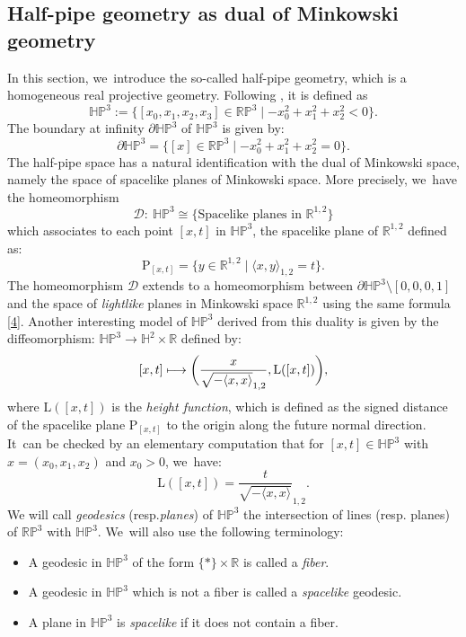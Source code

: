 \documentclass[11pt]{article}
\newcommand{\resp}{resp.\xspace}
\newcommand{\Subsection}{\subsection}
\newcommand\mto{\mathchoice{\longmapsto}{\mapsto}{\mapsto}{\mapsto}}
\theoremstyle{plain}
\theoremstyle{definition}
\newcommand{\minko}{\mathbb{R}^{1,2}}
\newcommand{\HP}{\mathbb{HP}^3}
\begin{document}
\Subsection{Half-pipe geometry as dual of Minkowski geometry}
In this section, we~introduce the so-called half-pipe geometry, which is a homogeneous real projective geometry. Following
\cite{danciger_thesis}, it is defined as
\[
\HP :=\{[x_0,x_1,x_2,x_3]\in\mathbb{RP}^3\mid -x_0^2+x_1^2+x_2^2<0\}.
\]
The boundary at infinity $\partial\HP$ of $\HP$ is given by:
\[
\partial\HP=\{[x]\in \mathbb{RP}^3\mid -x_0^2+x_1^2+x_2^2=0\}.
\]The half-pipe space has a natural identification with the dual of Minkowski space, namely the space of spacelike planes of Minkowski space. More precisely, we~have the homeomorphism
\begin{equation}\label{hpminko}
\mathcal{D}:\ \HP\cong \{\text{Spacelike planes in } \minko\}
\end{equation}
which associates to each point $[x,t]$ in $\HP$, the spacelike plane of $\minko$ defined as:
\begin{equation}\label{4}
\mathrm{P}_{[x,t]}=\{ y \in \minko \mid \langle x,y \rangle_{1,2} = t \}.
\end{equation}
The homeomorphism $\mathcal{D}$ extends to a homeomorphism between $\partial\HP\setminus[0,0,0,1]$ and the space of \emph{lightlike} planes in Minkowski space $\minko$ using the same formula \eqref{4}. Another interesting model of $\HP$ derived from this duality is given by the diffeomorphism: $\HP\to\mathbb{H}^2\times\mathbb{R}$ defined by:
\begin{equation}\label{L}
[x,t]\mto\biggl(\frac{x}{\sqrt{-\langle x,x\rangle}_{1,2}},\mathrm{L}([x,t])\biggr),
\end{equation}
where $\mathrm{L}([x,t])$ is the \emph{height function}, which is defined as the signed distance of the spacelike plane $\mathrm{P}_{[x,t]}$ to the origin along the future normal direction. It~can be checked by an elementary computation that for \([x,t] \in \HP\) with \(x = (x_0, x_1, x_2)\) and \(x_0 > 0\), we~have: \begin{equation}\label{formule_L}
\mathrm{L}([x,t])=\frac{t}{\sqrt{-\langle x,x\rangle}}_{1,2}.
\end{equation}
We will call \emph{geodesics} (\resp \emph{planes}) of $\HP$ the intersection of lines (\resp planes) of $\mathbb{RP}^3$ with $\HP$. We~will also use the following terminology:
\begin{itemize}
\item A geodesic in $\HP$ of the form $\{*\}\times \mathbb{R}$ is called a \emph{fiber}.
\item A geodesic in $\HP$ which is not a fiber is called a \emph{spacelike} geodesic.
\item A plane in $\HP$ is \emph{spacelike} if it does not contain a fiber.
\end{itemize}
\end{document}
